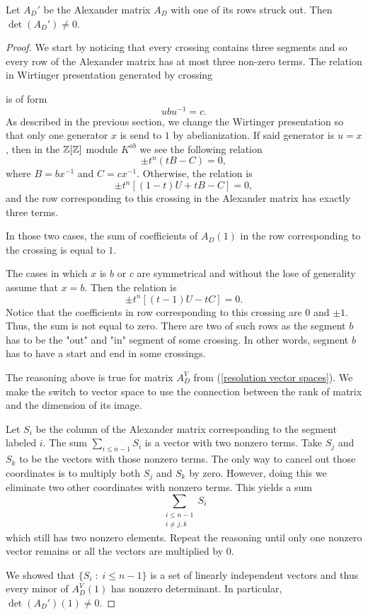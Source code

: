 \begin{lemma}\label{alexander matrix has trivial kernel}
  Let $A_D'$ be the Alexander matrix $A_D$ with one of its rows struck out. Then $\det(A_D')\neq 0$.
\end{lemma}

\begin{proof}
  We start by noticing that every crossing contains three segments and so every row of the Alexander matrix has at most three non-zero terms. The relation in Wirtinger presentation generated by crossing 
  \begin{center}
  \end{center}
  is of form
  $$ubu^{-1}=c.$$
  As described in the previous section, we change the Wirtinger presentation so that only one generator $x$ is send to $1$ by abelianization. If said generator is $u=x$, then in the $\operatorname{\mathbb{Z}}[\operatorname{\mathbb{Z}}]$ module $K^{ab}$ we see the following relation 
  $$\pm t^n(tB-C)=0,$$
  where $B=bx^{-1}$ and $C=cx^{-1}$. Otherwise, the relation is
  $$\pm t^n[(1-t)U+tB-C]=0,$$
  and the row corresponding to this crossing in the Alexander matrix has exactly three terms.

  In those two cases, the sum of coefficients of $A_D(1)$ in the row corresponding to the crossing is equal to $1$.

  The cases in which $x$ is $b$ or $c$ are symmetrical and without the lose of generality assume that $x=b$. Then the relation is 
  $$\pm t^n[(t-1)U-tC]=0.$$
  Notice that the coefficients in row corresponding to this crossing are $0$ and $\pm1$. Thus, the sum is not equal to zero. There are two of such rows as the segment $b$ has to be the "out" and "in" segment of some crossing. In other words, segment $b$ has to have a start and end in some crossings.

  The reasoning above is true for matrix $A_D^V$ from (\ref{resolution vector spaces}). We make the switch to vector space to use the connection between the rank of matrix and the dimension of its image.

  Let $S_i$ be the column of the Alexander matrix corresponding to the segment labeled $i$. The sum $\sum_{i\leq n-1} S_i$ is a vector with two nonzero terms. Take $S_j$ and $S_k$ to be the vectors with those nonzero terms. The only way to cancel out those coordinates is to multiply both $S_j$ and $S_k$ by zero. However, doing this we eliminate two other coordinates with nonzero terms. This yields a sum
  $$\sum_{\substack{i\leq n-1 \\ i\neq j,k}}S_i$$ 
  which still has two nonzero elements. Repeat the reasoning until only one nonzero vector remains or all the vectors are multiplied by $0$.

  We showed that $\{S_i\;:\;i\leq n-1\}$ is a set of linearly independent vectors and thus every minor of $A_D^V(1)$ has nonzero determinant. In particular, $\det(A_D')(1)\neq 0$.
\end{proof}

